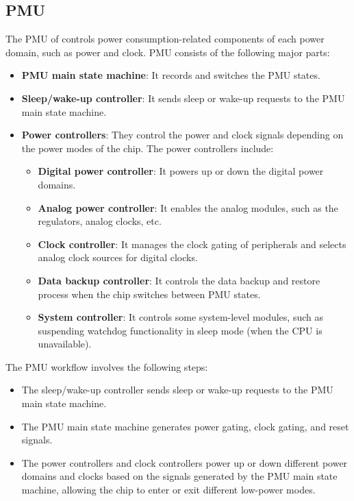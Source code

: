 \documentclass[main\_\_EN.tex]{subfiles}
\begin{document}
\subsection{PMU}

The PMU of \chipname{} controls power consumption-related components of each power domain, such as power and clock. PMU consists of the following major parts:

\begin{itemize}
    \item \textbf{PMU main state machine}: It records and switches the PMU states.
    \item \textbf{Sleep/wake-up controller}: It sends sleep or wake-up requests to the PMU main state machine.
    \item \textbf{Power controllers}: They control the power and clock signals depending on the power modes of the chip. The power controllers include:
        \begin{itemize}
            \item \textbf{Digital power controller}: It powers up or down the digital power domains.
            \item \textbf{Analog power controller}: It enables the analog modules, such as the regulators, analog clocks, etc.
            \item \textbf{Clock controller}: It manages the clock gating of peripherals and selects analog clock sources for digital clocks.
            \item \textbf{Data backup controller}: It controls the data backup and restore process when the chip switches between PMU states.

            \item \textbf{System controller}: It controls some system-level modules, such as suspending watchdog functionality in sleep mode (when the CPU is unavailable).
        \end{itemize}
\end{itemize}

The PMU workflow involves the following steps:

\begin{itemize}
\item The sleep/wake-up controller sends sleep or wake-up requests to the PMU main state machine.
\item The PMU main state machine generates power gating, clock gating, and reset signals.
\item The power controllers and clock controllers power up or down different power domains and clocks based on the signals generated by the PMU main state machine, allowing the chip to enter or exit different low-power modes.
\end{itemize}
\end{document}
